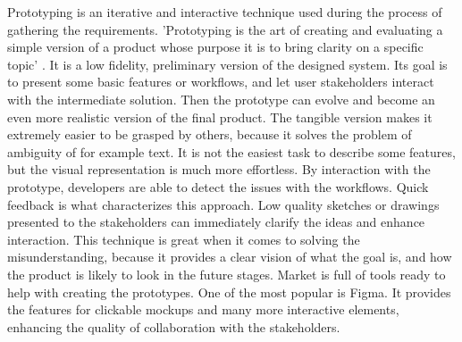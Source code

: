 Prototyping is an iterative and interactive technique used during the process of gathering the requirements. 'Prototyping is the art of creating and evaluating a simple version of a product whose purpose it is to bring clarity on a specific topic' \cite{Prototype}. It is a low fidelity, preliminary version of the designed system. Its goal is to present some basic features or workflows, and let user stakeholders interact with the intermediate solution. Then the prototype can evolve and become an even more realistic version of the final product. The tangible version makes it extremely easier to be grasped by others, because it solves the problem of ambiguity of for example text. It is not the easiest task to describe some features, but the visual representation is much more effortless. By interaction with the prototype, developers are able to detect the issues with the workflows. Quick feedback is what characterizes this approach. Low quality sketches or drawings presented to the stakeholders can immediately clarify the ideas and enhance interaction. This technique is great when it comes to solving the misunderstanding, because it provides a clear vision of what the goal is, and how the product is likely to look in the future stages. Market is full of tools ready to help with creating the prototypes. One of the most popular is Figma. It provides the features for clickable mockups and many more interactive elements, enhancing the quality of collaboration with the stakeholders. 



